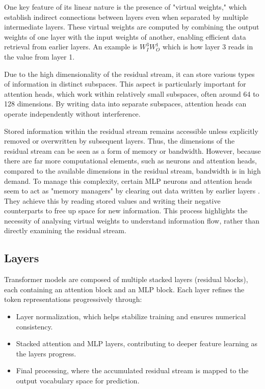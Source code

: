 One key feature of its linear nature is the presence of "virtual weights," which establish indirect connections between layers even when separated by multiple intermediate layers. These virtual weights are computed by combining the output weights of one layer with the input weights of another, enabling efficient data retrieval from earlier layers. An example is $W_I^3W_O^1$ which is how layer 3 reads in the value from layer 1.

Due to the high dimensionality of the residual stream, it can store various types of information in distinct subspaces. This aspect is particularly important for attention heads, which work within relatively small subspaces, often around 64 to 128 dimensions. By writing data into separate subspaces, attention heads can operate independently without interference.

Stored information within the residual stream remains accessible unless explicitly removed or overwritten by subsequent layers. Thus, the dimensions of the residual stream can be seen as a form of memory or bandwidth. However, because there are far more computational elements, such as neurons and attention heads, compared to the available dimensions in the residual stream, bandwidth is in high demand. To manage this complexity, certain MLP neurons and attention heads seem to act as "memory managers" by clearing out data written by earlier layers \cite{nanda_mathematical_nodate}. They achieve this by reading stored values and writing their negative counterparts to free up space for new information. This process highlights the necessity of analysing virtual weights to understand information flow, rather than directly examining the residual stream.

\subsection{Layers}
Transformer models are composed of multiple stacked layers (residual blocks), each containing an attention block and an MLP block. Each layer refines the token representations progressively through:
\begin{itemize}
    \item Layer normalization, which helps stabilize training and ensures numerical consistency.
    \item Stacked attention and MLP layers, contributing to deeper feature learning as the layers progress.
    \item Final processing, where the accumulated residual stream is mapped to the output vocabulary space for prediction.
\end{itemize}

